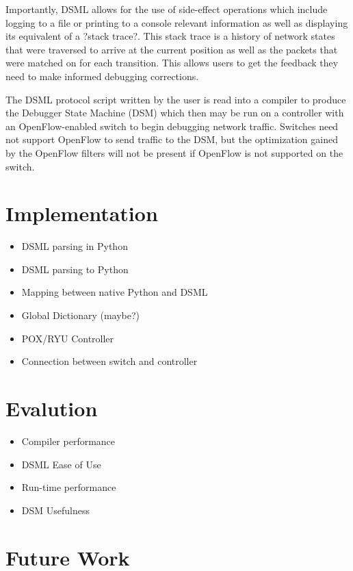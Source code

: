 \documentclass[letterpaper,twocolumn,10pt]{article}
\begin{document}
Importantly, DSML allows for the use of side-effect operations which include logging to a file or printing to a console relevant information as well as displaying its equivalent of a ?stack trace?. This stack trace is a history of network states that were traversed to arrive at the current position as well as the packets that were matched on for each transition. This allows users to get the feedback they need to make informed debugging corrections.

The DSML protocol script written by the user is read into a compiler to produce the Debugger State Machine (DSM) which then may be run on a controller with an OpenFlow-enabled switch to begin debugging network traffic. Switches need not support OpenFlow to send traffic to the DSM, but the optimization gained by the OpenFlow filters will not be present if OpenFlow is not supported on the switch.

\section{\LARGE Implementation}

\begin{itemize}
  \item DSML parsing in Python
  \item DSML parsing to Python
  \item Mapping between native Python and DSML
  \item Global Dictionary (maybe?)
  \item POX/RYU Controller
  \item Connection between switch and controller
\end{itemize}

\section{\LARGE Evalution}

\begin{itemize}
  \item Compiler performance
  \item DSML Ease of Use
  \item Run-time performance
  \item DSM Usefulness
\end{itemize}

\section{\LARGE Future Work}
\end{document}
